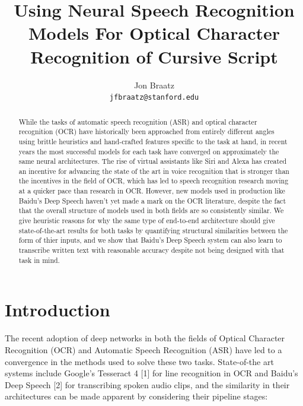 \documentclass{article}
\title{Using Neural Speech Recognition Models For Optical Character Recognition
  of Cursive Script}
\author{
  Jon Braatz\\
  \texttt{jfbraatz@stanford.edu} \\
}
\begin{document}

\maketitle

\begin{abstract}
  While the tasks of automatic speech recognition (ASR) and optical character
  recognition (OCR) have historically been approached from entirely different
  angles using brittle heuristics and hand-crafted features specific to the task
  at hand, in recent years the most successful models for each task have
  converged on approximately the same neural architectures. The rise of virtual
  assistants like Siri and Alexa has created an incentive for advancing the
  state of the art in voice recognition that is stronger than the incentives in
  the field of OCR, which has led to speech recognition research moving at a
  quicker pace than research in OCR. However, new models used in production like
  Baidu's Deep Speech haven't yet made a mark on the OCR literature, despite the
  fact that the overall structure of models used in both fields are so
  consistently similar. We give heuristic reasons for why the same type of
  end-to-end architecture should give state-of-the-art results for both tasks by
  quantifying structural similarities between the form of thier inputs, and we
  show that Baidu's Deep Speech system can also learn to transcribe written text
  with reasonable accuracy despite not being designed with that task in mind.
\end{abstract}

\section{Introduction}
The recent adoption of deep networks in both the fields of Optical Character
Recognition (OCR) and Automatic Speech Recognition (ASR) have led to a
convergence in the methods used to solve these two tasks. State-of-the art
systems include Google's Tesseract 4 [1] for line recognition in OCR and Baidu's
Deep Speech [2] for transcribing spoken audio clips, and the similarity in their
architectures can be made apparent by considering their pipeline stages:
\end{document}
